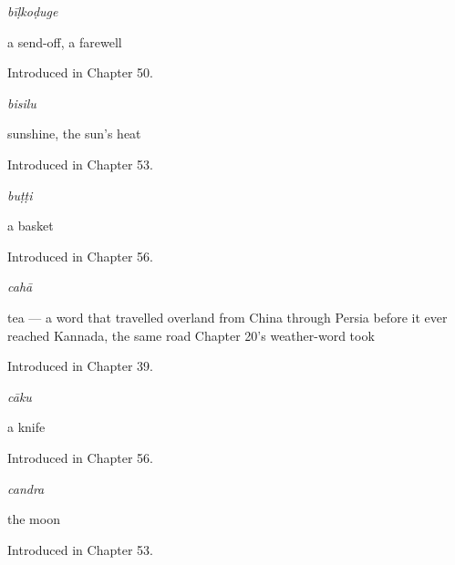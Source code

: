 \noindent\begin{minipage}[t]{\linewidth}
\raggedright
\textbf{}\enspace\emph{bīḷkoḍuge}\par
\small a send-off, a farewell\par
\footnotesize Introduced in Chapter 50.
\end{minipage}\par\medskip

\noindent\begin{minipage}[t]{\linewidth}
\raggedright
\textbf{}\enspace\emph{bisilu}\par
\small sunshine, the sun's heat\par
\footnotesize Introduced in Chapter 53.
\end{minipage}\par\medskip

\noindent\begin{minipage}[t]{\linewidth}
\raggedright
\textbf{}\enspace\emph{buṭṭi}\par
\small a basket\par
\footnotesize Introduced in Chapter 56.
\end{minipage}\par\medskip

\noindent\begin{minipage}[t]{\linewidth}
\raggedright
\textbf{}\enspace\emph{cahā}\par
\small tea — a word that travelled overland from China through Persia before it ever reached Kannada, the same road Chapter 20's weather-word took\par
\footnotesize Introduced in Chapter 39.
\end{minipage}\par\medskip

\noindent\begin{minipage}[t]{\linewidth}
\raggedright
\textbf{}\enspace\emph{cāku}\par
\small a knife\par
\footnotesize Introduced in Chapter 56.
\end{minipage}\par\medskip

\noindent\begin{minipage}[t]{\linewidth}
\raggedright
\textbf{}\enspace\emph{candra}\par
\small the moon\par
\footnotesize Introduced in Chapter 53.
\end{minipage}\par\medskip

